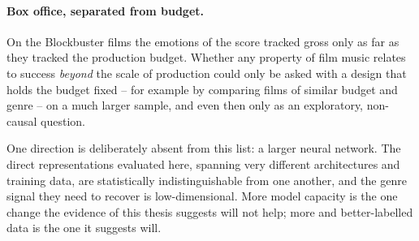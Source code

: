 \paragraph{Box office, separated from budget.} On the Blockbuster films the emotions of
the score tracked gross only as far as they tracked the production budget. Whether any
property of film music relates to success \emph{beyond} the scale of production could only
be asked with a design that holds the budget fixed -- for example by comparing films of
similar budget and genre -- on a much larger sample, and even then only as an exploratory,
non-causal question.

One direction is deliberately absent from this list: a larger neural network. The direct
representations evaluated here, spanning very different architectures and training data,
are statistically indistinguishable from one another, and the genre signal they need to
recover is low-dimensional. More model capacity is the one change the evidence of this
thesis suggests will not help; more and better-labelled data is the one it suggests will.
